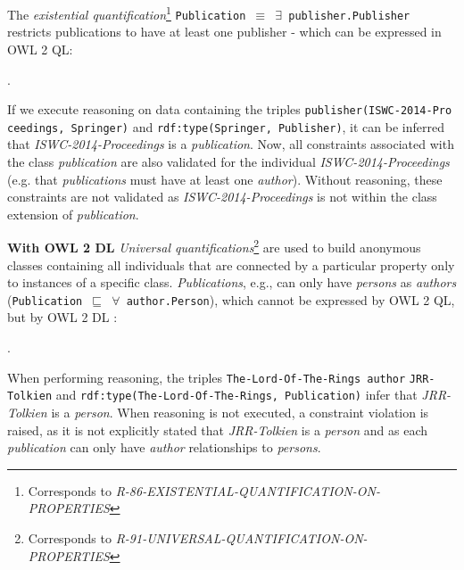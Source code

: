 \documentclass{llncs}
\newcommand{\ms}[1]{\texttt{#1}}
\begin{document}
The {\em existential quantification}\footnote{Corresponds to {\em R-86-EXISTENTIAL-QUANTIFICATION-ON-PROPERTIES}}
\ms{Publication $\equiv$ $\exists$ publisher.Publisher} restricts publications to have at least one publisher - which can be expressed in OWL 2 QL:
\begin{ex}
 .
\end{ex}
If we execute reasoning on data containing the triples \ms{publisher(ISWC-2014-Pro} \ms{ceedings, Springer)} and \ms{rdf:type(Springer, Publisher)}, 
it can be inferred that {\em ISWC-2014-Proceedings} is a {\em publication}.
Now, all constraints associated with the class {\em publication} are also validated for the individual {\em ISWC-2014-Proceedings} (e.g. that \emph{publications} must have at least one \emph{author}).
Without reasoning, these constraints are not validated as {\em ISWC-2014-Proceedings} is not within the class extension of {\em publication}.

%
%

\textbf{With OWL 2 DL}
{\em Universal quantifications}\footnote{Corresponds to {\em R-91-UNIVERSAL-QUANTIFICATION-ON-PROPERTIES}}
are used to build anonymous classes containing all individuals that are connected by a particular property only to instances of a specific class.
\emph{Publications}, e.g., can only have \emph{persons} as \emph{authors} (\ms{Publication $\sqsubseteq$ $\forall$ author.Person}), 
which cannot be expressed by OWL 2 QL, but by OWL 2 DL \cite{owl2profiles2008}:
\begin{ex}
 .
\end{ex}
When performing reasoning, the triples \ms{The-Lord-Of-The-Rings author} \ms{JRR-} \ms{Tolkien} and \ms{rdf:type(The-Lord-Of-The-Rings, Publication)} infer that \emph{JRR-Tolkien} is a \emph{person}.
When reasoning is not executed, a constraint violation is raised, 
as it is not explicitly stated that \emph{JRR-Tolkien} is a \emph{person} and
as each \emph{publication} can only have \emph{author} relationships to \emph{persons}.
\end{document}
